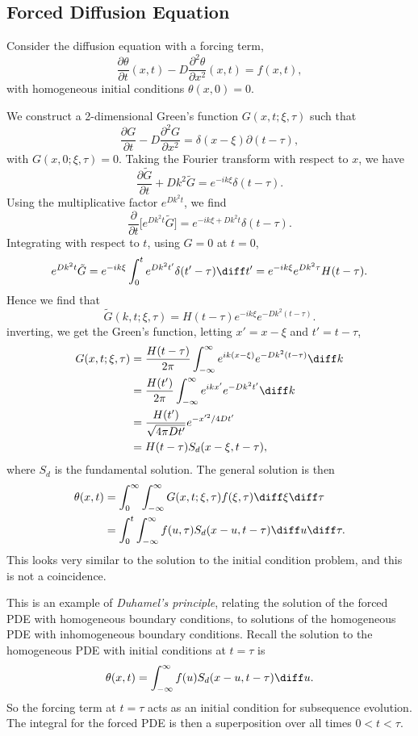 \documentclass[12pt]{article}
\begin{document}
\subsection{Forced Diffusion Equation}%
\label{sub:forced_diffusion_equation}

Consider the diffusion equation with a forcing term,
\[
	\frac{\partial \theta}{\partial t}(x, t) - D \frac{\partial^2 \theta}{\partial x^2}(x, t) = f(x, t)
,\]
with homogeneous initial conditions $\theta(x, 0) = 0$.

We construct a 2-dimensional Green's function $G(x, t; \xi, \tau)$ such that
\[
	\frac{\partial G}{\partial t} - D \frac{\partial^2 G}{\partial x^2} = \delta(x - \xi) \partial(t - \tau)
,\]
with $G(x, 0; \xi, \tau) = 0$. Taking the Fourier transform with respect to $x$, we have
\[
	\frac{\partial \tilde G}{\partial t} + D k^2 \tilde G = e^{-i k \xi} \delta(t - \tau)
.\]
Using the multiplicative factor $e^{Dk^2t}$, we find
\[
	\frac{\partial}{\partial t} \bigl[ e^{Dk^2t} \tilde G \bigr] = e^{-ik\xi + Dk^2t} \delta(t - \tau)
.\]
Integrating with respect to $t$, using $G = 0$ at $t = 0$,
\[
	e^{Dk^2t} \tilde G = e^{-ik \xi} \int_{0}^{t} e^{Dk^2t'}\delta(t' - \tau) \diff t' = e^{-ik\xi} e^{Dk^2\tau}H(t - \tau)
.\]
Hence we find that
\[
	\tilde G(k, t; \xi, \tau) = H(t - \tau) e^{-ik \xi}e^{-Dk^2(t - \tau)}
.\]
inverting, we get the Green's function, letting $x' = x - \xi$ and $t' = t - \tau$,
\begin{align*}
	G(x, t;\xi, \tau) &= \frac{H(t - \tau)}{2 \pi} \int_{-\infty}^{\infty} e^{ik(x - \xi)}e^{-Dk^2(t - \tau)}\diff k \\
			  &= \frac{H(t')}{2 \pi}\int_{-\infty}^{\infty}e^{ikx'}e^{-Dk^2t'} \diff k \\
			  &= \frac{H(t')}{\sqrt{4 \pi D t'}}e^{-x'^2/4Dt'} \\
			  &= H(t - \tau) S_d(x - \xi, t - \tau),
\end{align*}
where $S_d$ is the fundamental solution. The general solution is then
\begin{align*}
	\theta(x, t) &= \int_{0}^{\infty}\int_{-\infty}^{\infty}G(x, t;\xi, \tau) f(\xi, \tau) \diff \xi \diff \tau \\
		     &= \int_{0}^{t}\int_{-\infty}^{\infty}f(u, \tau) S_d(x - u, t - \tau) \diff u \diff \tau.
\end{align*}
This looks very similar to the solution to the initial condition problem, and this is not a coincidence.

This is an example of \textit{Duhamel's principle}, relating the solution of the forced PDE with homogeneous boundary conditions, to solutions of the homogeneous PDE with inhomogeneous boundary conditions. Recall the solution to the homogeneous PDE with initial conditions at $t = \tau$ is
\[
	\theta(x, t) = \int_{-\infty}^{\infty}f(u) S_d (x - u, t - \tau) \diff u
.\]
So the forcing term at $t = \tau$ acts as an initial condition for subsequence evolution. The integral for the forced PDE is then a superposition over all times $0 < t < \tau$.
\end{document}
